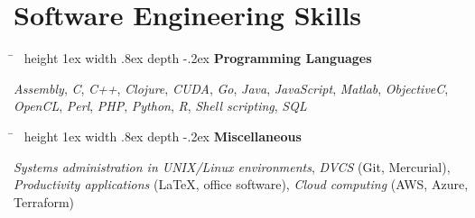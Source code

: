 \documentclass[10pt]{article} %
\newlength{\smallertextwidth}
\newcommand{\sqbullet}{~\vrule height 1ex width .8ex depth -.2ex} %
\newcommand{\skillgroup}[2]{
\begin{tabbing}
\hspace{5mm} \= \kill
\sqbullet \>\+ \textbf{#1}\\
\begin{minipage}{\smallertextwidth}
\vspace{2mm}
#2
\end{minipage}
\end{tabbing}
}
\newcommand{\interestsgroup}[1]{
\begin{tabbing}%
\hspace{5mm}\=\kill%
#1%
\end{tabbing}
\vspace{-10mm}
}
\newcommand{\reference}[4]{
\parbox[t]{0.5\textwidth}{
\begin{tabbing}
\hspace{2cm} \= \hspace{4cm} \= \kill
\textbf{Name} \> #1\\
\textbf{Company} \> #2\\
\textbf{Position} \> #3\\
\textbf{Contact} \> \href{mailto:{#4}}{#4}
\end{tabbing}
}}
\begin{document}

\section{Software Engineering Skills}

\skillgroup{Programming Languages}
{

\textit{Assembly}, \textit{C}, \textit{C++},
\textit{Clojure},
\textit{CUDA},
\textit{Go},
\textit{Java},
\textit{JavaScript},
\textit{Matlab},
\textit{ObjectiveC},
\textit{OpenCL},
\textit{Perl},
\textit{PHP},
\textit{Python},
\textit{R},
\textit{Shell scripting},
\textit{SQL}
}


\skillgroup{Miscellaneous}
{
\textit{Systems administration in UNIX/Linux environments},
\textit{DVCS} (Git, Mercurial), 
\textit{Productivity applications} (LaTeX, office software),
\textit{Cloud computing} (AWS, Azure, Terraform)
}





%
%

\end{document}
